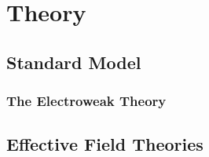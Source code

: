 \chapter{Theory}
\label{sec:theory}




\section{Standard Model}
\subsection{The Electroweak Theory}
\section{Effective Field Theories}



